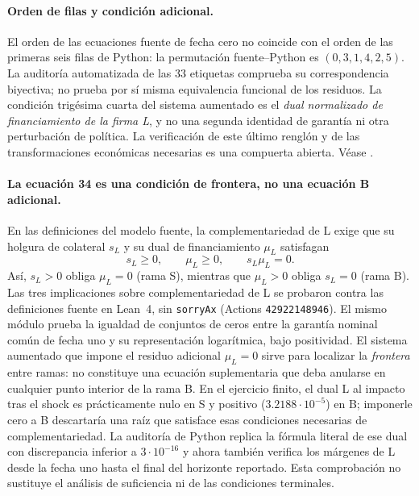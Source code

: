 \paragraph{Orden de filas y condición adicional.}
El orden de las ecuaciones fuente de fecha cero no coincide
con el orden de las primeras seis filas de Python:
la permutación fuente--Python es $(0,3,1,4,2,5)$.
La auditoría automatizada de las 33 etiquetas comprueba
su correspondencia biyectiva; no prueba por sí misma
equivalencia funcional de los residuos. La condición
trigésima cuarta del sistema aumentado es el \emph{dual
normalizado de financiamiento de la firma L}, y no una
segunda identidad de garantía ni otra perturbación
de política. La verificación de este último renglón
y de las transformaciones económicas necesarias es
una compuerta abierta. Véase
.

\paragraph{La ecuación 34 es una condición de frontera, no una ecuación B adicional.}
En las definiciones del modelo fuente, la complementariedad de L
exige que su holgura de colateral $s_L$ y su dual de
financiamiento $\mu_L$ satisfagan
\[
 s_L\geq 0,\qquad \mu_L\geq 0,\qquad s_L\mu_L=0.
\]
Así, $s_L>0$ obliga $\mu_L=0$ (rama S), mientras que
$\mu_L>0$ obliga $s_L=0$ (rama B).
Las tres implicaciones sobre complementariedad de L
se probaron contra las definiciones fuente en Lean~4,
sin \texttt{sorryAx} (Actions \texttt{42922148946}).
El mismo módulo prueba la igualdad de conjuntos de
ceros entre la garantía nominal común de fecha uno y
su representación logarítmica, bajo positividad.
El sistema aumentado que impone el residuo adicional
$\mu_L=0$ sirve para localizar la \emph{frontera} entre
ramas: no constituye una ecuación suplementaria que deba
anularse en cualquier punto interior de la rama B.
En el ejercicio finito, el dual L al impacto tras el shock
es prácticamente nulo en S y positivo
($3.2188\cdot10^{-5}$) en B; imponerle cero a B
descartaría una raíz que satisface esas condiciones
necesarias de complementariedad. La auditoría de Python
replica la fórmula literal de ese dual con discrepancia
inferior a $3\cdot10^{-16}$ y ahora también verifica los
márgenes de L desde la fecha uno hasta el final del
horizonte reportado. Esta comprobación no sustituye
el análisis de suficiencia ni de las condiciones
terminales.

